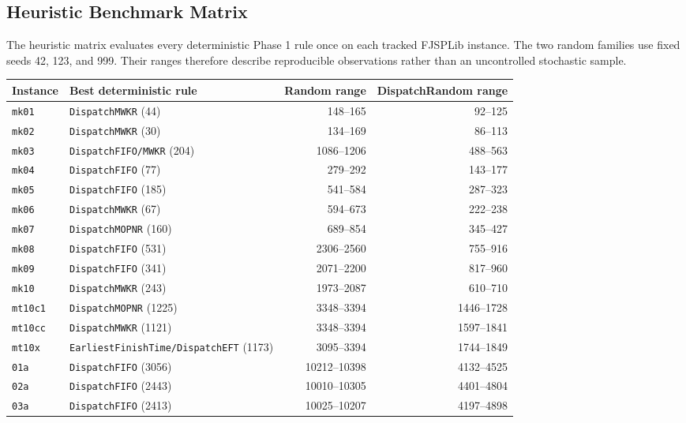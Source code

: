 ﻿\documentclass[11pt]{article}
\begin{document}
\subsection{Heuristic Benchmark Matrix}

The heuristic matrix evaluates every deterministic Phase 1 rule once on each
tracked FJSPLib instance. The two random families use fixed seeds 42, 123, and
999. Their ranges therefore describe reproducible observations rather than an
uncontrolled stochastic sample.

\begin{table}[h]
\centering
\small
\setlength{\tabcolsep}{4pt}
\begin{tabular}{llrr}
\toprule
Instance & Best deterministic rule & Random range & DispatchRandom range \\
\midrule
\texttt{mk01} & \texttt{DispatchMWKR} (44) & 148--165 & 92--125 \\
\texttt{mk02} & \texttt{DispatchMWKR} (30) & 134--169 & 86--113 \\
\texttt{mk03} & \texttt{DispatchFIFO/MWKR} (204) & 1086--1206 & 488--563 \\
\texttt{mk04} & \texttt{DispatchFIFO} (77) & 279--292 & 143--177 \\
\texttt{mk05} & \texttt{DispatchFIFO} (185) & 541--584 & 287--323 \\
\texttt{mk06} & \texttt{DispatchMWKR} (67) & 594--673 & 222--238 \\
\texttt{mk07} & \texttt{DispatchMOPNR} (160) & 689--854 & 345--427 \\
\texttt{mk08} & \texttt{DispatchFIFO} (531) & 2306--2560 & 755--916 \\
\texttt{mk09} & \texttt{DispatchFIFO} (341) & 2071--2200 & 817--960 \\
\texttt{mk10} & \texttt{DispatchMWKR} (243) & 1973--2087 & 610--710 \\
\texttt{mt10c1} & \texttt{DispatchMOPNR} (1225) & 3348--3394 & 1446--1728 \\
\texttt{mt10cc} & \texttt{DispatchMWKR} (1121) & 3348--3394 & 1597--1841 \\
\texttt{mt10x} & \texttt{EarliestFinishTime/DispatchEFT} (1173) & 3095--3394 & 1744--1849 \\
\texttt{01a} & \texttt{DispatchFIFO} (3056) & 10212--10398 & 4132--4525 \\
\texttt{02a} & \texttt{DispatchFIFO} (2443) & 10010--10305 & 4401--4804 \\
\texttt{03a} & \texttt{DispatchFIFO} (2413) & 10025--10207 & 4197--4898 \\

\end{tabular}
\end{table}
\end{document}
